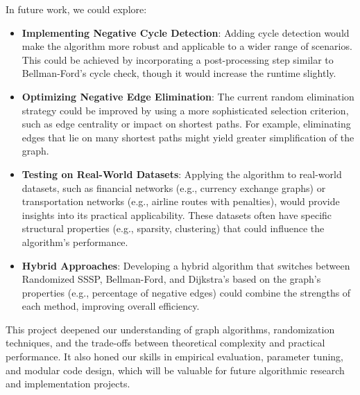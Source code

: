 \documentclass[12pt]{article}
\begin{document}
In future work, we could explore:
\begin{itemize}
    \item \textbf{Implementing Negative Cycle Detection}: Adding cycle detection would make the algorithm more robust and applicable to a wider range of scenarios. This could be achieved by incorporating a post-processing step similar to Bellman-Ford’s cycle check, though it would increase the runtime slightly.
    \item \textbf{Optimizing Negative Edge Elimination}: The current random elimination strategy could be improved by using a more sophisticated selection criterion, such as edge centrality or impact on shortest paths. For example, eliminating edges that lie on many shortest paths might yield greater simplification of the graph.
    \item \textbf{Testing on Real-World Datasets}: Applying the algorithm to real-world datasets, such as financial networks (e.g., currency exchange graphs) or transportation networks (e.g., airline routes with penalties), would provide insights into its practical applicability. These datasets often have specific structural properties (e.g., sparsity, clustering) that could influence the algorithm’s performance.
    \item \textbf{Hybrid Approaches}: Developing a hybrid algorithm that switches between Randomized SSSP, Bellman-Ford, and Dijkstra’s based on the graph’s properties (e.g., percentage of negative edges) could combine the strengths of each method, improving overall efficiency.
\end{itemize}

This project deepened our understanding of graph algorithms, randomization techniques, and the trade-offs between theoretical complexity and practical performance. It also honed our skills in empirical evaluation, parameter tuning, and modular code design, which will be valuable for future algorithmic research and implementation projects.
\end{document}
